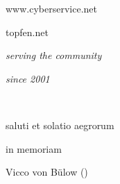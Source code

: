 \documentclass[
ngerman,
paper=a4,
asymmetric,
fontsize=9pt,
draft=false,
openany,
numbers=noenddot,
bibtotocnumbered,
footnotes=multiple,
toc=flat,
]{scrbook}
\begin{document}
\begin{titlepage}
\begin{WidePar}
\begin{minipage}{8cm}
\begin{center}
        {\sffamily{}www.cyberservice.net}\par\vspace{2em}
    
        {\Huge topfen.net}\par\vspace{1em}
        \textit{serving the community} \par \textit{since 2001}
    \end{center}
    \end{minipage}
    \vspace{2em}
    \begin{center}
    \end{center}
    
    \end{WidePar}

\clearpage
\thispagestyle{empty}

~
\vspace{3cm}

\begin{center}
saluti et solatio aegrorum
\end{center}



\bigskip

\bigskip

\bigskip

\bigskip

\bigskip

\bigskip

\bigskip

\bigskip

\bigskip

\bigskip


\vfill

\begin{center}

\bigskip

\bigskip

in memoriam

Vicco von Bülow ()


\vspace{3cm}

\end{center}

\end{titlepage}
\end{document}
